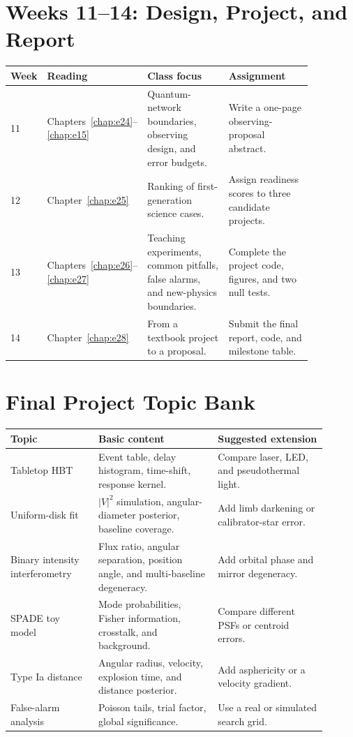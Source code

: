 \section{Weeks 11--14: Design, Project, and Report}
\label{appsec:f-project}

\begin{longtable}{@{}p{0.09\linewidth}p{0.21\linewidth}p{0.27\linewidth}p{0.29\linewidth}@{}}
\toprule
Week & Reading & Class focus & Assignment \\
\midrule
11 & Chapters~\ref{chap:e24}--\ref{chap:e15} & Quantum-network boundaries, observing design, and error budgets. & Write a one-page observing-proposal abstract. \\
12 & Chapter~\ref{chap:e25} & Ranking of first-generation science cases. & Assign readiness scores to three candidate projects. \\
13 & Chapters~\ref{chap:e26}--\ref{chap:e27} & Teaching experiments, common pitfalls, false alarms, and new-physics boundaries. & Complete the project code, figures, and two null tests. \\
14 & Chapter~\ref{chap:e28} & From a textbook project to a proposal. & Submit the final report, code, and milestone table. \\
\bottomrule
\end{longtable}

\section{Final Project Topic Bank}
\label{appsec:f-project-list}

\begin{longtable}{p{0.25\linewidth}p{0.34\linewidth}p{0.31\linewidth}}
\toprule
Topic & Basic content & Suggested extension \\
\midrule
Tabletop HBT & Event table, delay histogram, time-shift, response kernel. & Compare laser, LED, and pseudothermal light. \\
Uniform-disk fit & \(|V|^2\) simulation, angular-diameter posterior, baseline coverage. & Add limb darkening or calibrator-star error. \\
Binary intensity interferometry & Flux ratio, angular separation, position angle, and multi-baseline degeneracy. & Add orbital phase and mirror degeneracy. \\
SPADE toy model & Mode probabilities, Fisher information, crosstalk, and background. & Compare different PSFs or centroid errors. \\
Type Ia distance & Angular radius, velocity, explosion time, and distance posterior. & Add asphericity or a velocity gradient. \\
False-alarm analysis & Poisson tails, trial factor, global significance. & Use a real or simulated search grid. \\
\bottomrule
\end{longtable}
